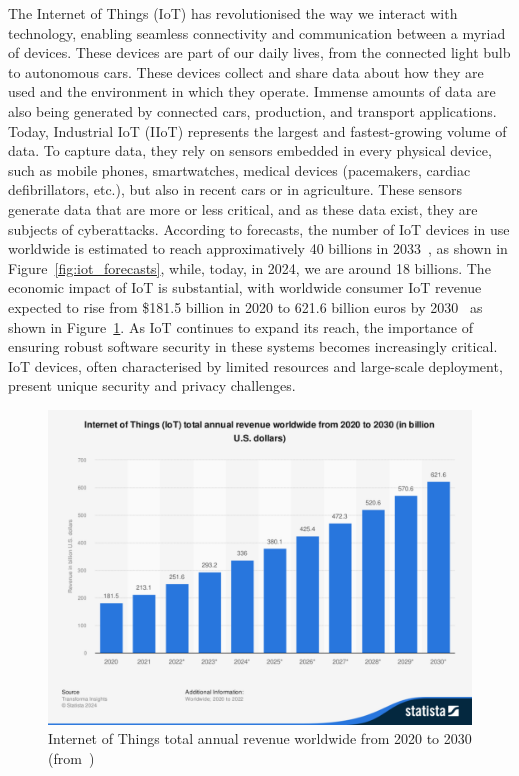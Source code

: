 The Internet of Things (IoT) has revolutionised the way we interact with technology, enabling seamless connectivity and communication between a myriad of devices. These devices are part of our daily lives, from the connected light bulb to autonomous cars. These devices collect and share data about how they are used and the environment in which they operate.  Immense amounts of data are also being generated by connected cars, production, and transport applications. Today, Industrial IoT (IIoT) represents the largest and fastest-growing volume of data.
To capture data, they rely on sensors embedded in every physical device, such as mobile phones, smartwatches, medical devices (pacemakers, cardiac defibrillators, etc.), but also in recent cars or in agriculture. These sensors generate data that are more or less critical, and as these data exist, they are subjects of cyberattacks.
According to forecasts, the number of IoT devices in use worldwide is estimated to reach approximatively 40 billions in 2033~\cite{statista_iot}, as shown in Figure~\ref{fig:iot_forecasts}, while, today, in 2024, we are around 18 billions. The economic impact of IoT is substantial, with worldwide consumer IoT revenue expected to rise from \$181.5 billion in 2020 to 621.6 billion euros by 2030~\cite{statista_iot_revenu} as shown in Figure~\ref{fig:iot_revenue}.
As IoT continues to expand its reach, the importance of ensuring robust software security in these systems becomes increasingly critical. IoT devices, often characterised by limited resources and large-scale deployment, present unique security and privacy challenges.

\begin{figure}[ht]
    \centering
    \includegraphics[width=\linewidth, trim={1.25cm 4.75cm 1cm 3.75cm}, clip]{c1_intro/img/iot_revenue.pdf}
    \caption{Internet of Things total annual revenue worldwide from 2020 to 2030 (from~\cite{statista_iot_revenu})}
    \label{fig:iot_revenue}
\end{figure}


